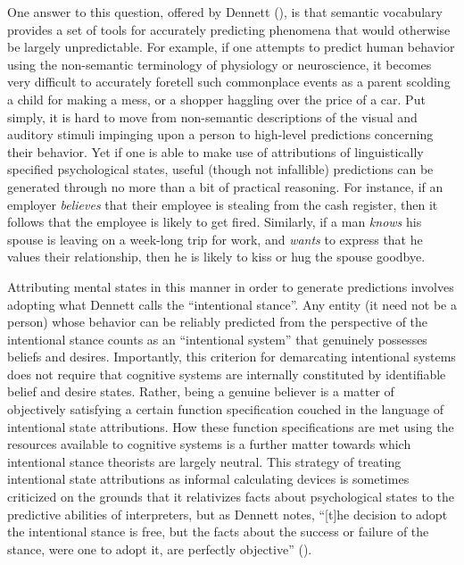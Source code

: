 One answer to this question, offered by Dennett (\citeyear{Dennett:1991,Dennett:1987}), is that semantic vocabulary provides a set of tools for accurately predicting phenomena that would otherwise be largely unpredictable. For example, if one attempts to predict human behavior using the non-semantic terminology of physiology or neuroscience, it becomes very difficult to accurately foretell such commonplace events as a parent scolding a child for making a mess, or a shopper haggling over the price of a car. Put simply, it is hard to move from non-semantic descriptions of the visual and auditory stimuli impinging upon a person to high-level predictions concerning their behavior. Yet if one is able to make use of attributions of linguistically specified psychological states, useful (though not infallible) predictions can be generated through no more than a bit of practical reasoning. For instance, if an employer \textit{believes} that their employee is stealing from the cash register, then it follows that the employee is likely to get fired. Similarly, if a man \textit{knows} his spouse is leaving on a week-long trip for work, and \textit{wants} to express that he values their relationship, then he is likely to kiss or hug the spouse goodbye. 

Attributing mental states in this manner in order to generate predictions involves adopting what Dennett calls the ``intentional stance''. Any entity (it need not be a person) whose behavior can be reliably predicted from the perspective of the intentional stance counts as an ``intentional system'' that genuinely possesses beliefs and desires. Importantly, this criterion for demarcating intentional systems does not require that cognitive systems are internally constituted by identifiable belief and desire states. Rather, being a genuine believer is a matter of objectively satisfying a certain function specification couched in the language of intentional state attributions. How these function specifications are met using the resources available to cognitive systems is a further matter towards which intentional stance theorists are largely neutral. This strategy of treating intentional state attributions as informal calculating devices is sometimes criticized on the grounds that it relativizes facts about psychological states to the predictive abilities of interpreters, but as Dennett notes, ``[t]he decision to adopt the intentional stance is free, but the facts about the success or failure of the stance, were one to adopt it, are perfectly objective'' (\citeyear[][p. 24]{Dennett:1987}).

